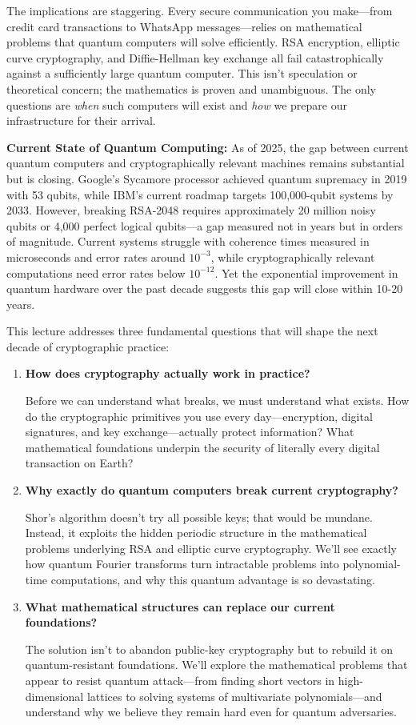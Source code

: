 \documentclass[11pt,a4paper]{article}
\begin{document}
The implications are staggering. Every secure communication you make---from credit card transactions to WhatsApp messages---relies on mathematical problems that quantum computers will solve efficiently. RSA encryption, elliptic curve cryptography, and Diffie-Hellman key exchange all fail catastrophically against a sufficiently large quantum computer. This isn't speculation or theoretical concern; the mathematics is proven and unambiguous. The only questions are \emph{when} such computers will exist and \emph{how} we prepare our infrastructure for their arrival.

\textbf{Current State of Quantum Computing:} As of 2025, the gap between current quantum computers and cryptographically relevant machines remains substantial but is closing. Google's Sycamore processor achieved quantum supremacy in 2019 with 53 qubits, while IBM's current roadmap targets 100,000-qubit systems by 2033. However, breaking RSA-2048 requires approximately 20 million noisy qubits or 4,000 perfect logical qubits---a gap measured not in years but in orders of magnitude. Current systems struggle with coherence times measured in microseconds and error rates around $10^{-3}$, while cryptographically relevant computations need error rates below $10^{-12}$. Yet the exponential improvement in quantum hardware over the past decade suggests this gap will close within 10-20 years.

This lecture addresses three fundamental questions that will shape the next decade of cryptographic practice:

\begin{enumerate}
    \item \textbf{How does cryptography actually work in practice?} 
    
    Before we can understand what breaks, we must understand what exists. How do the cryptographic primitives you use every day---encryption, digital signatures, and key exchange---actually protect information? What mathematical foundations underpin the security of literally every digital transaction on Earth?
    
    \item \textbf{Why exactly do quantum computers break current cryptography?}
    
    Shor's algorithm doesn't try all possible keys; that would be mundane. Instead, it exploits the hidden periodic structure in the mathematical problems underlying RSA and elliptic curve cryptography. We'll see exactly how quantum Fourier transforms turn intractable problems into polynomial-time computations, and why this quantum advantage is so devastating.
    
    \item \textbf{What mathematical structures can replace our current foundations?}
    
    The solution isn't to abandon public-key cryptography but to rebuild it on quantum-resistant foundations. We'll explore the mathematical problems that appear to resist quantum attack---from finding short vectors in high-dimensional lattices to solving systems of multivariate polynomials---and understand why we believe they remain hard even for quantum adversaries.
\end{enumerate}
\end{document}
